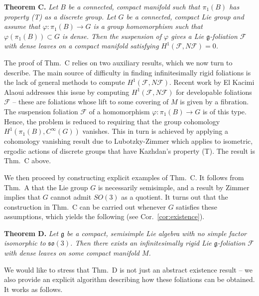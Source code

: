 \documentclass[11pt, letterpaper, oneside,reqno]{amsart}
\theoremstyle{plain}
\theoremstyle{underline}
\theoremstyle{definition}
\theoremstyle{remark}
\begin{document}
	\vspace{0.2cm}
	\noindent
	\textbf{Theorem C.} \emph{Let $B$ be a connected, compact manifold such that $\pi_1(B)$ has property (T) as a discrete group. Let $G$ be a connected, compact Lie group and assume that $\varphi:\pi_1(B)\rightarrow G$ is a group homomorphism such that $\varphi(\pi_1(B))\subset G$ is dense. Then the suspension of $\varphi$ gives a Lie $\mathfrak{g}$-foliation $\mathcal{F}$ with dense leaves on a compact manifold satisfying $H^{1}(\mathcal{F},N\mathcal{F})=0$.}
	
	\vspace{0.2cm}
	\noindent
	The proof of Thm.~C relies on two auxiliary results, which we now turn to describe. The main source of difficulty in finding infinitesimally rigid foliations is the lack of general methods to compute $H^{1}(\mathcal{F},N\mathcal{F})$. Recent work by El Kacimi Alaoui \cite{Kacimi} addresses this issue by computing $H^{1}(\mathcal{F},N\mathcal{F})$ for developable foliations $\mathcal{F}$ -- these are foliations whose lift to some covering of $M$ is given by a fibration. The suspension foliation $\mathcal{F}$ of a homomorphism $\varphi:\pi_{1}(B)\rightarrow G$ is of this type. Hence, the problem is reduced to requiring that the group cohomology $H^{1}(\pi_1(B),C^{\infty}(G))$ vanishes. This in turn is achieved by applying a cohomology vanishing result due to Lubotzky-Zimmer \cite{Zimmer} which applies to isometric, ergodic actions of discrete groups that have Kazhdan's property (T). The result is Thm.~C above.
	
	\vspace{0.2cm}
	We then proceed by constructing explicit examples of Thm.~C. It follows from Thm.~A that the Lie group $G$ is necessarily semisimple, and a result by Zimmer \cite{zimmer-actions} implies that $G$ cannot admit $SO(3)$ as a quotient. It turns out that the construction in Thm.~C can be carried out whenever $G$ satisfies these assumptions, which yields the following (see Cor.~\ref{cor:existence}).
	
	\vspace{0.2cm}
	\noindent
	\textbf{Theorem D.} \emph{Let $\mathfrak{g}$ be a compact, semisimple Lie algebra with no simple factor isomorphic to $\mathfrak{so}(3)$. Then there exists an infinitesimally rigid Lie $\mathfrak{g}$-foliation $\mathcal{F}$ with dense leaves on some compact manifold $M$.}
	
	\vspace{0.2cm}
	\noindent
	We would like to stress that Thm.~D is not just an abstract existence result -- we also provide an explicit algorithm describing how these foliations can be obtained. It works as follows.
	
\end{document}
